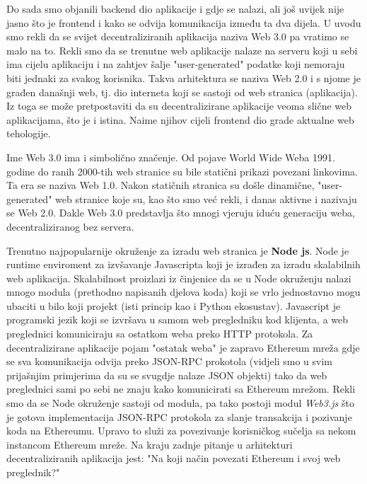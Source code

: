 \documentclass[a4paper,oneside,12pt]{memoir} %
\begin{document}
Do sada smo objanili backend dio aplikacije i gdje se nalazi, ali još uvijek nije jasno što je frontend i kako se odvija komunikacija između ta dva dijela. U uvodu smo rekli da se svijet decentraliziranih aplikacija naziva Web 3.0 pa vratimo se malo na to. Rekli smo da se trenutne web aplikacije nalaze na serveru koji u sebi ima cijelu aplikaciju i na zahtjev šalje "user-generated" podatke koji nemoraju biti jednaki za svakog korisnika. Takva arhitektura se naziva Web 2.0 i s njome je građen današnji web, tj. dio interneta koji se sastoji od web stranica (aplikacija). Iz toga se može pretpostaviti da su decentralizirane aplikacije veoma slične web aplikacijama, što je i istina. Naime njihov cijeli frontend dio grade aktualne web tehologije.

\begin{tcolorbox}
Ime Web 3.0 ima i simbolično značenje. Od pojave World Wide Weba 1991. godine do ranih 2000-tih web stranice su bile statični prikazi povezani linkovima. Ta era se naziva Web 1.0. Nakon statičnih stranica su došle dinamične, "user-generated" web stranice koje su, kao što smo već rekli, i danas aktivne i nazivaju se Web 2.0. Dakle Web 3.0 predstavlja što mnogi vjeruju iduću generaciju weba, decentraliziranog bez servera.
\end{tcolorbox}

Trenutno najpopularnije okruženje za izradu web stranica je \textbf{Node js}. Node je runtime enviroment za izvšavanje Javascripta koji je izrađen za izradu skalabilnih web aplikacija. Skalabilnost proizlazi iz činjenice da se u Node okruženju nalazi mnogo modula (prethodno napisanih djelova koda) koji se vrlo jednostavno mogu ubaciti u bilo koji projekt (isti princip kao i Python ekosustav). Javascript je programski jezik koji se izvršava u samom web pregledniku kod klijenta, a web preglednici komuniciraju sa ostatkom weba preko HTTP protokola. Za decentralizirane aplikacije pojam "ostatak weba" je zapravo Ethereum mreža gdje se sva komunikacija odvija preko JSON-RPC prokotola (vidjeli smo u svim prijašnjim primjerima da su se svugdje nalaze JSON objekti) tako da web preglednici sami po sebi ne znaju kako komunicirati sa Ethereum mrežom. Rekli smo da se Node okruženje sastoji od modula, pa tako postoji modul \emph{Web3.js} što je gotova implementacija JSON-RPC protokola za slanje transakcija i pozivanje koda na Ethereumu. Upravo to služi za povezivanje korisničkog sučelja sa nekom instancom Ethereum mreže. Na kraju zadnje pitanje u arhitekturi decentraliziranih aplikacija jest: "Na koji način povezati Ethereum i svoj web preglednik?"
\end{document}
